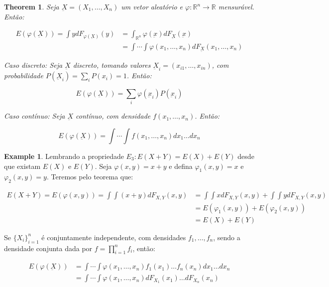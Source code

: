 \documentclass[
]{article}
\newtheorem{theorem}{Theorem}[section]
\theoremstyle{definition}
\theoremstyle{definition}
\newtheorem{example}{Example}[section]
\theoremstyle{definition}
\theoremstyle{definition}
\theoremstyle{remark}
\begin{document}
\begin{theorem}
Seja \(\underbar{X} = (X_{1},\ldots,X_{n})\) um vetor aleatório e \(\varphi:\mathbb{R}^{n} \to \mathbb{R}\) mensurável. Então:

\begin{align*}
E(\varphi(\underbar{X})) = \int ydF_{\varphi\left(\underbar{X}\right)}(y) &= \int_{\mathbb{R}^{n}}\varphi(\underbar{x})dF_{\underbar{X}}(\underbar{x}) \\
&= \int \cdots \int \varphi(x_{1},\ldots,x_{n})dF_{\underbar{X}}(x_{1},\ldots,x_{n})
\end{align*}

Caso discreto: Seja \(\underbar{X}\) discreto, tomando valores \(\underbar{X}_{i} = (x_{i1},\ldots,x_{in})\), com probabilidade \(P(\underbar{X}_{i}) = \sum_{i}P(x_{i}) = 1\). Então:

\begin{equation*}
E(\varphi(\underbar{X})) = \sum_{i}\varphi(\underbar{x}_{i})P(\underbar{x}_{i})
\end{equation*}

Caso contínuo: Seja \(\underbar{X}\) contínuo, com densidade \(f(x_{1},\ldots,x_{n})\). Então:

\begin{equation*}
E(\varphi(\underbar{X})) = \int \cdots \int f(x_{1},\ldots,x_{n})dx_{1}\ldots dx_{n}
\end{equation*}
\end{theorem}

\begin{example}
Lembrando a propriedade \(E_{3}: E(X + Y) = E(X) + E(Y)\) desde que existam \(E(X)\) e \(E(Y)\). Seja \(\varphi(x,y) = x + y\) e defina \(\varphi_{1}(x,y) = x\) e \(\varphi_{2}(x,y) = y\). Teremos pelo teorema que:

\begin{align*}
E(X + Y) = E(\varphi(x,y)) = \int \int(x+y)dF_{X,Y}(x,y) &= \int\int x dF_{X,Y}(x,y) + \int\int y dF_{X,Y}(x,y) \\
&= E(\varphi_{1}(x,y)) + E(\varphi_{2}(x,y)) \\
&= E(X) + E(Y)
\end{align*}
\end{example}

Se \(\{X_{i}\}_{i=1}^{n}\) é conjuntamente independente, com densidades \(f_{1},\ldots,f_{n}\), sendo a densidade conjunta dada por \(f = \prod_{i = 1}^{n}f_{i}\), então:

\begin{align*}
E(\varphi(\underbar{X})) &= \int \cdots \int \varphi(x_{1},\ldots,x_{n})f_{1}(x_{1})\ldots f_{n}(x_{n})dx_{1}\ldots dx_{n} \\
&= \int \cdots \int \varphi(x_{1}, \ldots, x_{n})dF_{X_{1}}(x_{1})\ldots dF_{X_{n}}(x_{n})
\end{align*}
\end{document}
